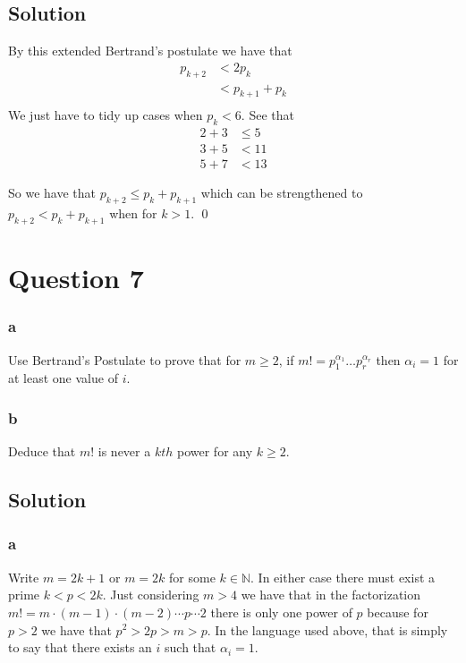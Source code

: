 \documentclass{unswmaths}
\begin{document}
\subsection*{Solution}
By this extended Bertrand's postulate we have that
\begin{align*} 
	p_{k+2} &< 2p_k \\
		&< p_{k+1} + p_k \\
\end{align*}
We just have to tidy up cases when $ p_k < 6 $.
See that 
\begin{align*}
	2 + 3 &\leq 5 \\
	3 + 5 &< 11 \\
	5 + 7 &< 13
\end{align*}

So we have that $ p_{k+2} \leq p_k + p_{k+1} $ which can be strengthened
to $ p_{k+2} < p_k + p_{k+1} $ when for $ k > 1 $. \qed

\section*{Question 7}
\subsubsection*{a} Use Bertrand's Postulate to prove that for 
$ m \geq 2 $, if $ m! = p_1^{\alpha_1} \ldots p_r^{\alpha_r} $ then $ \alpha_i = 1 $  
for at least one value of $ i $.
\subsubsection*{b} Deduce that $ m! $ is never a $ kth $ power 
for any $ k \geq 2 $.

\subsection*{Solution}
\subsubsection*{a}
Write $ m = 2k + 1 $ or $ m = 2k $ for some $ k \in \mathbb{N} $.
In either case there must exist a prime $ k < p < 2k $. 
Just considering $ m > 4 $ we have that in the factorization 
$ m! = m\cdot(m-1)\cdot(m-2)\cdots p \cdots 2 $ there is only 
one power of $ p $ because for $ p > 2 $ we have that
$ p^2 > 2p > m > p $. 
In the language used above, that is simply to say that there 
exists an $i $ such that $ \alpha_i = 1 $.
\end{document}
